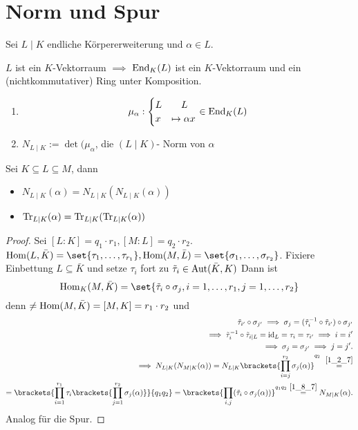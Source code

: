 \section{Norm und Spur}
Sei $L\mid K$ endliche Körpererweiterung und $\alpha \in L$.
\begin{remark}
	$L$ ist ein $K$-Vektorraum $\implies$ $\operatorname{End}_K (L)$ ist ein $K$-Vektorraum und ein (nichtkommutativer) Ring unter Komposition.
\end{remark}
\begin{definition}
	\begin{enumerate}
		\item \begin{align*}
		\mu_{\alpha} : \begin{cases}
		L & \quad L\\
		x &\mapsto \alpha x
		\end{cases} \in \operatorname{End}_K (L)
		\end{align*}
		\item $N_{L \mid K} := \det(\mu_{\alpha}$, die $(L \mid K)$- Norm von $\alpha$
	\end{enumerate}
\end{definition}
\begin{conclusion}
	Sei $K \subseteq L \subseteq M$, dann
	\begin{itemize}
		\item $N_{L \mid K}(\alpha) = N_{L\mid K}(N_{L\mid K}(\alpha))$
		\item $\operatorname{Tr}_{L \mid K}(\alpha) = \operatorname{Tr}_{L \mid K}(\operatorname{Tr}_{L \mid K}(\alpha))$
	\end{itemize}
\end{conclusion}
\begin{proof}
	Sei $[L:K] = q_1 \cdot r_1, [M:L] = q_2 \cdot r_2$. $\Hom(L, \bar{K}) = \set{\tau_1, \dots, \tau_{r_1}}, \Hom(M, \bar{L}) = \set{\sigma_1, \dots, \sigma_{r_2}}$. Fixiere Einbettung $L \subseteq \bar{K}$ und setze $\tau_i$ fort zu $\tilde{\tau}_i \in \operatorname{Aut}(\bar{K}, K)$  %
	Dann ist
	\[
		\Hom_K(M, \bar{K}) = \set{\tilde{\tau}_i \circ \sigma_j, i =1, \dots, r_1, j = 1, \dots, r_2}
	\]
	denn $\neq \operatorname{Hom}(M, \bar{K}) = [M, K] = r_1 \cdot r_2$ und
	\begin{align*} %
		\tilde{\tau}_{i'} \circ \sigma_{j'} \implies \sigma_j = (\tilde{\tau}_i^{-1} \circ \tilde{\tau}_{i'})\circ \sigma_{j'}\\
		\implies \tilde{\tau}_i^{-1} \circ \tilde{\tau}_{i\mid L} = \id_L = \tau_i = \tau_{i'} \implies i = i'\\
		\implies \sigma_j = \sigma_{j'} \implies j = j'.\\
		\implies N_{L\mid K}(N_{M\mid K}(\alpha)) = N_{L\mid K}\brackets{\prod_{i=j}^{r_2} \sigma_j (\alpha)}^{q_2}\ \overset{\cref*{1_2_7}}{=}\\
		= \brackets{ \prod_{i=1}^{r_1} \tau_i \brackets{\prod_{j=1}^{r_2} \sigma_j (\alpha) }}{q_1 q_2} = \brackets{\prod_{i,j} (\tilde{\tau}_i \circ \sigma_j (\alpha))}^{q_1 q_2} \overset{\cref{1_8_7}}{=} N_{M \mid K}(\alpha).
	\end{align*}
	Analog für die Spur.
\end{proof}
